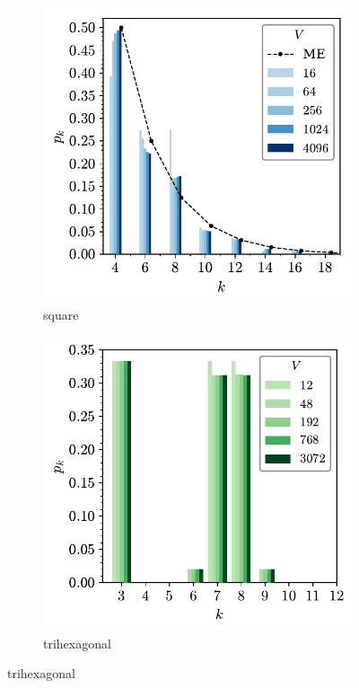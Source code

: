\begin{figure}[btp]
     \centering
     
     \begin{subfigure}[b]{0.40\textwidth}
         \centering
         \includegraphics[width=\textwidth]{./figures/procrystals/sq3_pk.pdf}
         \caption{square}
         \label{fig:pro3pka}
     \end{subfigure}
          \hfill
      \begin{subfigure}[b]{0.40\textwidth}
         \centering
         \includegraphics[width=\textwidth]{./figures/procrystals/trihex3_pk.pdf}
         \caption{trihexagonal}
         \label{fig:pro3pkb}
     \end{subfigure}
     \hfill
     	

\end{figure}
